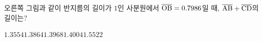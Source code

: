 \noindent\begin{minipage}[t]{0.58\linewidth}\vspace{0pt}\raggedright 오른쪽 그림과 같이 반지름의 길이가 $1$인 사분원에서 $\overline{\mathrm{OB}}=0.7986$일 때, $\overline{\mathrm{AB}}+\overline{\mathrm{CD}}$의 길이는?\end{minipage}\hfill\begin{minipage}[t]{0.4\linewidth}\vspace{0pt}\centering \resizebox{\ifdim\width>\linewidth\linewidth\else\width\fi}{!}{}\end{minipage}\par
\begin{choicesii}{$1.3554$}{$1.3864$}{$1.3968$}{$1.4004$}{$1.5522$}\end{choicesii}
